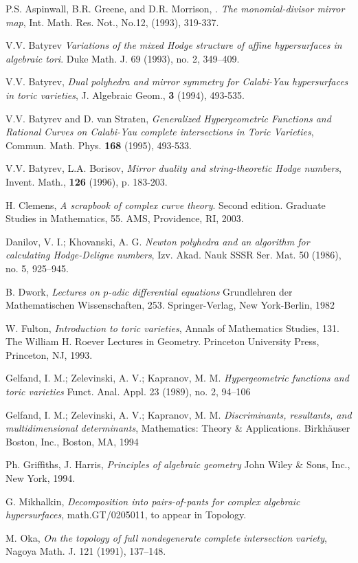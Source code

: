 \begin{thebibliography}{99}
 P.S. Aspinwall,  B.R. Greene, and D.R. Morrison, .
{\em The monomial-divisor mirror map}, 
Int. Math. Res. Not., No.12, (1993),  319-337. 

  {V.V. Batyrev} {\em Variations of the mixed Hodge 
structure of affine hypersurfaces in algebraic tori}.  
Duke Math. J.  69  (1993),  no. 2, 349--409.

 {V.V. Batyrev}, {\em Dual polyhedra and mirror symmetry for 
Calabi-Yau hypersurfaces in toric varieties}, J. Algebraic Geom., 
{\bf 3} (1994), 493-535. 



  {V.V. Batyrev} and D. van Straten, {\em 
Generalized Hypergeometric Functions and Rational Curves on Calabi-Yau 
complete intersections in Toric Varieties}, Commun. Math. Phys. 
{\bf 168} (1995), 493-533. 



 {V.V. Batyrev, L.A. Borisov}, 
{\em Mirror duality and string-theoretic Hodge numbers},  
Invent. Math., {\bf 126} (1996), p. 183-203.


 H. Clemens, {\em A scrapbook of complex curve theory}. 
Second edition. Graduate Studies in Mathematics, 55. 
AMS, Providence, RI, 2003.


Danilov, V. I.; Khovanski, A. G. {\em 
Newton polyhedra and an algorithm for calculating Hodge-Deligne numbers}, 
Izv. Akad. Nauk SSSR Ser. Mat.  50  (1986),  no. 5, 925--945.

 B. Dwork, {\em 
Lectures on $p$-adic differential equations} 
Grundlehren der Mathematischen Wissenschaften,  253. Springer-Verlag, 
New York-Berlin, 1982


 W. Fulton, {\em Introduction to toric varieties}, 
Annals of Mathematics Studies, 131. 
The William H. Roever Lectures in Geometry. Princeton University Press, 
Princeton, NJ, 1993.


 Gelfand, I. M.; Zelevinski, A. V.; Kapranov, M. M. 
{\em Hypergeometric functions and toric varieties} 
Funct. Anal. Appl.  23  (1989),  no. 2, 94--106

 Gelfand, I. M.; Zelevinski, A. V.; Kapranov, M. M. {\em 
Discriminants, resultants, and multidimensional determinants}, 
Mathematics: Theory \& Applications. Birkh\"auser Boston, Inc., 
Boston, MA, 1994


 Ph. Griffiths, J. Harris, {\em 
Principles of algebraic geometry} John Wiley \& Sons, Inc., New York, 1994.

 G. Mikhalkin, 
{\em Decomposition into pairs-of-pants for complex algebraic 
hypersurfaces}, math.GT/0205011, to appear in Topology.


 M. Oka, {\em On the topology of full nondegenerate complete 
intersection variety},   Nagoya Math. J.  121  (1991), 137--148.




\end{thebibliography}





